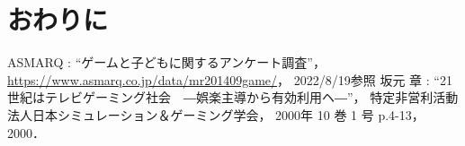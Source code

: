 \documentclass[twocolumn,10pt,a4j]{ltjsarticle}
\begin{document}
\section{おわりに}



\begin{thebibliography}{99}
 ASMARQ : ``ゲームと子どもに関するアンケート調査''， \url{https://www.asmarq.co.jp/data/mr201409game/}， 2022/8/19参照
 坂元 章 : ``21世紀はテレビゲーミング社会　―娯楽主導から有効利用ヘ―''， 特定非営利活動法人日本シミュレーション＆ゲーミング学会， 2000年 10 巻 1 号 p.4-13， 2000．
\end{thebibliography}
\end{document}
